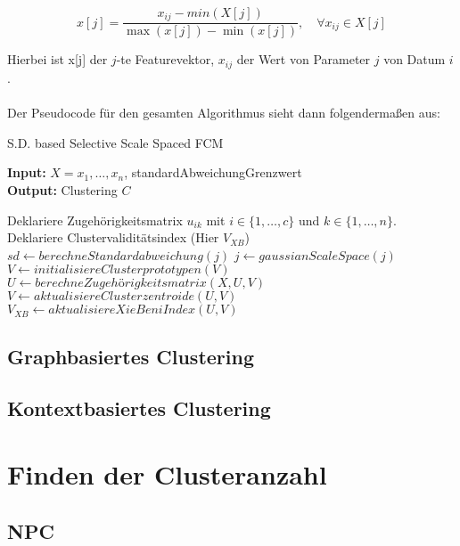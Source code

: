 \documentclass[11pt,ceqn]{book}
\begin{document}
$$x[j] = \frac{x_{ij}-min(X[j])}{\max(x[j])-\min(x[j])},\quad \forall x_{ij} \in X[j]$$

Hierbei ist x[j] der $j$-te Featurevektor, $x_{ij}$ der Wert von Parameter $j$ von Datum $i$.
\\~\\
Der Pseudocode für den gesamten Algorithmus sieht dann folgendermaßen aus:

\begin{algorithm}[H]
\caption{ S.D. based Selective Scale Spaced FCM}\label{sdbsssfcm}
\hspace*{\algorithmicindent} \textbf{Input:} $X={x_1,\dots,x_n}$, standardAbweichungGrenzwert\\
 \hspace*{\algorithmicindent} \textbf{Output:} Clustering $C$ 
\begin{algorithmic}[1]
\State Deklariere Zugehörigkeitsmatrix $u_{ik}$ mit $i\in \{1,\dots,c\}$ und $k \in \{1,\dots,n\}$.
\State Deklariere Clustervaliditätsindex (Hier $V_{XB}$)
	\State $sd \gets berechneStandardabweichung(j)$
		 \State $j \gets gaussianScaleSpace(j)$ 
	\EndIf
\EndFor
\State $V\gets initialisiereClusterprototypen(V)$
	\State $U\gets berechneZugehörigkeitsmatrix(X,U,V)$
	\State $V\gets aktualisiereClusterzentroide(U,V)$
	\State $V_{XB} \gets aktualisiereXieBeniIndex(U,V)$
\EndWhile


\end{algorithmic}
\end{algorithm}



\subsection{Graphbasiertes Clustering}


\subsection{Kontextbasiertes Clustering}







\section{Finden der Clusteranzahl}
\subsection{NPC}
\end{document}
